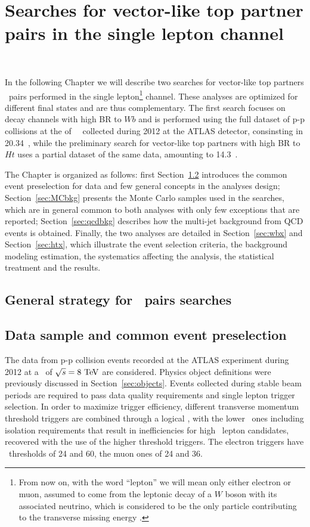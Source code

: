 \clearpage{\pagestyle{empty}\cleardoublepage}

\chapter{Searches for vector-like top partner pairs in the single lepton channel}~\label{chap:vlq}

In the following Chapter we will describe two searches for vector-like 
top partners \TTbar\ pairs performed in the single 
lepton\footnote{From now on, with the word ``lepton'' we will 
mean only either electron or muon, assumed to come from the leptonic
decay of a $W$ boson with its associated neutrino, which is considered
to be the only particle contributing to the transverse missing energy \met.} channel. 
These analyses
are optimized for different final states and are thus complementary.
The first search focuses on decay channels with high BR to $Wb$ and is 
performed using the full dataset of p-p collisions at the \cme of ~\tev\
collected during 2012 at the ATLAS detector, consinsting in 20.34~\ifb, while
the preliminary search for vector-like top partners with high BR to $Ht$
uses a partial dataset of the same data, amounting to 14.3~\ifb.

The Chapter is organized as follows: first Section~\ref{sec:presel}
introduces the common event preselection for data and few general concepts in the
analyses design; Section~\ref{sec:MCbkg}
presents the Monte Carlo samples used in the searches, which
are in general common to both analyses with only few exceptions that are reported;
Section~\ref{sec:qcdbkg} describes how the multi-jet background from QCD events is
obtained.
Finally, the two analyses are detailed in Section~\ref{sec:wbx} and Section~\ref{sec:htx}, 
which illustrate the event selection criteria, the background modeling estimation, 
the systematics affecting the analysis, the statistical treatment and the
results.

\section{General strategy for \TTbar\ pairs searches}\label{sec:strategy}

\section{Data sample and common event preselection}\label{sec:presel}

The data from p-p collision events recorded at the ATLAS experiment during
2012 at a \cme\ of $\rts=8\tev$ are considered. Physics object definitions 
were previously discussed in Section~\ref{sec:objects}.
Events collected during
stable beam periods are required to pass data quality requirements and
single lepton trigger selection. In order to maximize trigger
efficiency, different transverse momentum threshold triggers are combined
through a logical \OR, with the lower \pt\ ones including isolation requirements
that result in inefficiencies for high \pt\ lepton candidates, recovered with
the use of the higher threshold triggers. The electron triggers have
\pt\ thresholds of 24 and 60\gev, the muon ones of 24 and 36\gev.

